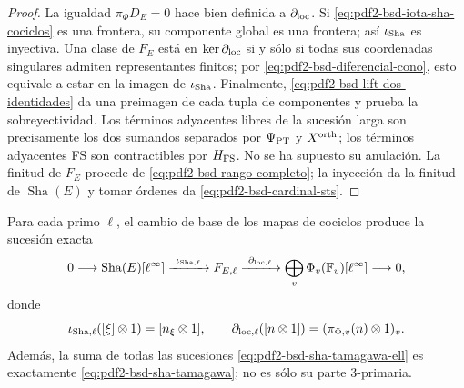 \begin{proof}
La igualdad $\pi_\Phi D_E=0$ hace bien definida a
$\partial_{\rm loc}$. Si \eqref{eq:pdf2-bsd-iota-sha-cociclos} es una
frontera, su componente global es una frontera; así $\iota_{\rm Sha}$ es
inyectiva. Una clase de $F_E$ está en $\ker\partial_{\rm loc}$ si y sólo
si todas sus coordenadas singulares admiten representantes finitos; por
\eqref{eq:pdf2-bsd-diferencial-cono}, esto equivale a estar en la imagen de
$\iota_{\rm Sha}$. Finalmente,
\eqref{eq:pdf2-bsd-lift-dos-identidades} da una preimagen de cada tupla de
componentes y prueba la sobreyectividad. Los términos adyacentes libres de
la sucesión larga son precisamente los dos sumandos separados por
$\Psi_{\rm PT}$ y $X^{\rm orth}$; los términos adyacentes FS son
contractibles por $H_{\rm FS}$. No se ha supuesto su anulación. La finitud
de $F_E$ procede de \eqref{eq:pdf2-bsd-rango-completo}; la inyección da la
 finitud de $\operatorname{Sha}(E)$ y tomar órdenes da
 \eqref{eq:pdf2-bsd-cardinal-sts}.
\end{proof}

\begin{corollary}
\label{cor:pdf2-bsd-sha-tamagawa-todos-ell}
Para cada primo $\ell$, el cambio de base de los mapas de cociclos produce
la sucesión exacta
\begin{equation}\label{eq:pdf2-bsd-sha-tamagawa-ell}
 0\longrightarrow\operatorname{Sha}(E)[\ell^\infty]
 \xrightarrow{\ \iota_{{\rm Sha},\ell}\ }F_{E,\ell}
 \xrightarrow{\ \partial_{{\rm loc},\ell}\ }
 \bigoplus_v\Phi_v(\mathbb F_v)[\ell^\infty]
 \longrightarrow0,
\end{equation}
donde
\begin{equation}\label{eq:pdf2-bsd-mapas-ell-generadores}
 \iota_{{\rm Sha},\ell}([\xi]\otimes1)
   =[n_\xi\otimes1],
 \qquad
 \partial_{{\rm loc},\ell}([n\otimes1])
   =(\pi_{\Phi,v}(n)\otimes1)_v.
\end{equation}
Además, la suma de todas las sucesiones
\eqref{eq:pdf2-bsd-sha-tamagawa-ell} es exactamente
\eqref{eq:pdf2-bsd-sha-tamagawa}; no es sólo su parte $3$-primaria.
\end{corollary}

